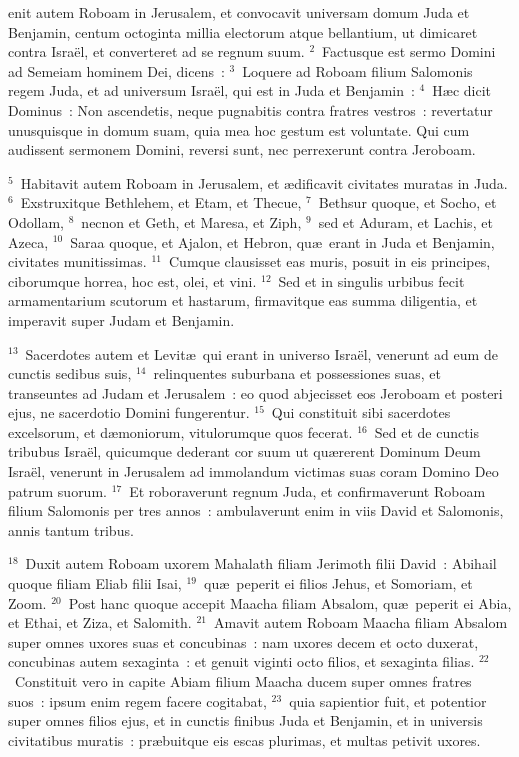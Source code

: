 \bchapter
{}enit autem Roboam in Jerusalem, et convocavit universam domum Juda et Benjamin, centum octoginta millia electorum atque bellantium, ut dimicaret contra Isra\"el, et converteret ad se regnum suum.
${}^{2}$~Factusque est sermo Domini ad Semeiam hominem Dei, dicens~:
${}^{3}$~Loquere ad Roboam filium Salomonis regem Juda, et ad universum Isra\"el, qui est in Juda et Benjamin~:
${}^{4}$~H\ae c dicit Dominus~: Non ascendetis, neque pugnabitis contra fratres vestros~: revertatur unusquisque in domum suam, quia mea hoc gestum est voluntate. Qui cum audissent sermonem Domini, reversi sunt, nec perrexerunt contra Jeroboam.


${}^{5}$~Habitavit autem Roboam in Jerusalem, et \ae dificavit civitates muratas in Juda.
${}^{6}$~Exstruxitque Bethlehem, et Etam, et Thecue,
${}^{7}$~Bethsur quoque, et Socho, et Odollam,
${}^{8}$~necnon et Geth, et Maresa, et Ziph,
${}^{9}$~sed et Aduram, et Lachis, et Azeca,
${}^{10}$~Saraa quoque, et Ajalon, et Hebron, qu\ae\ erant in Juda et Benjamin, civitates munitissimas.
${}^{11}$~Cumque clausisset eas muris, posuit in eis principes, ciborumque horrea, hoc est, olei, et vini.
${}^{12}$~Sed et in singulis urbibus fecit armamentarium scutorum et hastarum, firmavitque eas summa diligentia, et imperavit super Judam et Benjamin.


${}^{13}$~Sacerdotes autem et Levit\ae\ qui erant in universo Isra\"el, venerunt ad eum de cunctis sedibus suis,
${}^{14}$~relinquentes suburbana et possessiones suas, et transeuntes ad Judam et Jerusalem~: eo quod abjecisset eos Jeroboam et posteri ejus, ne sacerdotio Domini fungerentur.
${}^{15}$~Qui constituit sibi sacerdotes excelsorum, et d\ae moniorum, vitulorumque quos fecerat.
${}^{16}$~Sed et de cunctis tribubus Isra\"el, quicumque dederant cor suum ut qu\ae rerent Dominum Deum Isra\"el, venerunt in Jerusalem ad immolandum victimas suas coram Domino Deo patrum suorum.
${}^{17}$~Et roboraverunt regnum Juda, et confirmaverunt Roboam filium Salomonis per tres annos~: ambulaverunt enim in viis David et Salomonis, annis tantum tribus.


${}^{18}$~Duxit autem Roboam uxorem Mahalath filiam Jerimoth filii David~: Abihail quoque filiam Eliab filii Isai,
${}^{19}$~qu\ae\ peperit ei filios Jehus, et Somoriam, et Zoom.
${}^{20}$~Post hanc quoque accepit Maacha filiam Absalom, qu\ae\ peperit ei Abia, et Ethai, et Ziza, et Salomith.
${}^{21}$~Amavit autem Roboam Maacha filiam Absalom super omnes uxores suas et concubinas~: nam uxores decem et octo duxerat, concubinas autem sexaginta~: et genuit viginti octo filios, et sexaginta filias.
${}^{22}$~Constituit vero in capite Abiam filium Maacha ducem super omnes fratres suos~: ipsum enim regem facere cogitabat,
${}^{23}$~quia sapientior fuit, et potentior super omnes filios ejus, et in cunctis finibus Juda et Benjamin, et in universis civitatibus muratis~: pr\ae buitque eis escas plurimas, et multas petivit uxores.

